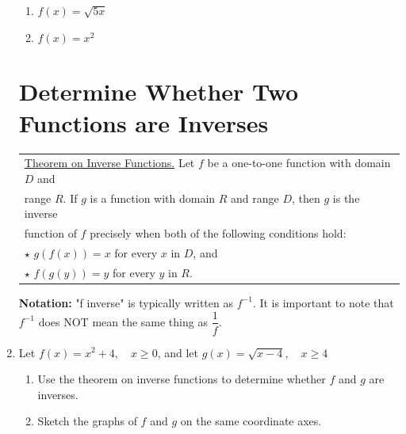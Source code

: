 \documentclass[11pt]{article}
\begin{document}
\begin{enumerate}
\begin{enumerate}
\item $f(x) = \sqrt{5x}$
\vfill
\item $f(x) = x^2$
\end{enumerate}
\vfill


\newpage


\section{Determine Whether Two Functions are Inverses}


\noindent \begin{tabular}{ | l  |} \hline
\noindent \underline{Theorem on Inverse Functions.} Let $f$ be a one-to-one function with domain $D$ and  \\ range $R$. If $g$ is a function with domain $R$ and range $D$, then $g$ is the inverse \\ function of $f$ precisely when both of the following conditions hold:   \\ 
$ \star$ \quad $g(f(x))=x$ for every $x$ in $D$, and \\
$ \star$ \quad $f(g(y))=y$ for every $y$ in $R$.\\ \hline
\end{tabular} 

\noindent \textbf{Notation:}  "f inverse" is typically written as $f^{-1}$. It is important to note that $f^{-1}$ does NOT mean the same thing as $\dfrac{1}{f}$.


\item Let $f(x) = x^2+4, \quad x \geq 0$, and let $g(x) = \sqrt{x-4}, \quad x \geq 4 $

\begin{enumerate}
\item Use the theorem on inverse functions to determine whether $f$ and $g$ are inverses.  \\[2in]
\item Sketch the graphs of $f$ and $g$ on the same coordinate axes.


\end{enumerate}
\end{enumerate}
\end{document}
